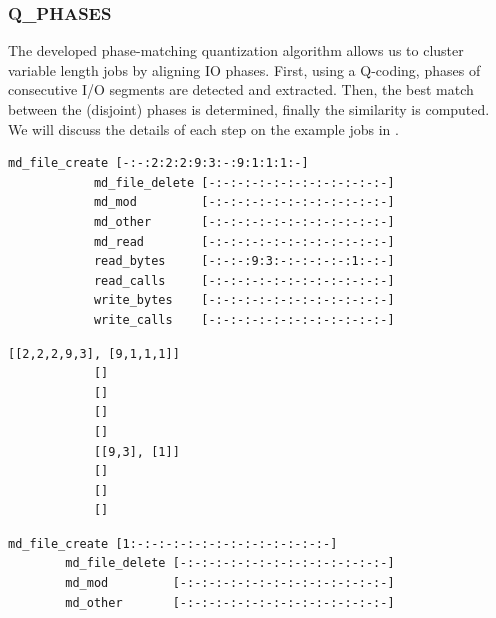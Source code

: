 \documentclass{jhps}
\begin{document}
\FloatBarrier
\subsubsection{Q\_PHASES}
The developed phase-matching quantization algorithm allows us to cluster variable length jobs by aligning IO phases.
First, using a Q-coding, phases of consecutive I/O segments are detected and extracted.
Then, the best match between the (disjoint) phases is determined, finally the similarity is computed.
We will discuss the details of each step on the example jobs in .


\begin{listing}
	\noindent\begin{minipage}{\textwidth}
		\noindent\begin{minipage}{0.6\textwidth}
			\begin{lstlisting}[basicstyle=\fontsize{8}{8}\ttfamily]
			md_file_create [-:-:2:2:2:9:3:-:9:1:1:1:-]
			md_file_delete [-:-:-:-:-:-:-:-:-:-:-:-:-]
			md_mod         [-:-:-:-:-:-:-:-:-:-:-:-:-]
			md_other       [-:-:-:-:-:-:-:-:-:-:-:-:-]
			md_read        [-:-:-:-:-:-:-:-:-:-:-:-:-]
			read_bytes     [-:-:-:9:3:-:-:-:-:-:1:-:-]
			read_calls     [-:-:-:-:-:-:-:-:-:-:-:-:-]
			write_bytes    [-:-:-:-:-:-:-:-:-:-:-:-:-]
			write_calls    [-:-:-:-:-:-:-:-:-:-:-:-:-]
			\end{lstlisting}
			\vspace{-2em}
			\label{lst:sim:pm_quant:job_a}
		\end{minipage}
		\noindent\begin{minipage}{0.39\textwidth}
			\begin{lstlisting}[basicstyle=\fontsize{8}{8}\ttfamily]
			[[2,2,2,9,3], [9,1,1,1]]
			[]
			[]
			[]
			[]
			[[9,3], [1]]
			[]
			[]
			[]
			\end{lstlisting}
			\vspace{-2em}
			\label{lst:sim:pm_quant:phases:job_a}
		\end{minipage}
	\end{minipage}
	\noindent\begin{minipage}{\textwidth}
		\noindent\begin{minipage}{0.60\textwidth}
		\begin{lstlisting}[basicstyle=\fontsize{8}{8}\ttfamily]
		md_file_create [1:-:-:-:-:-:-:-:-:-:-:-:-:-:-]
		md_file_delete [-:-:-:-:-:-:-:-:-:-:-:-:-:-:-]
		md_mod         [-:-:-:-:-:-:-:-:-:-:-:-:-:-:-]
		md_other       [-:-:-:-:-:-:-:-:-:-:-:-:-:-:-]

\end{lstlisting}
\end{minipage}
\end{minipage}
\end{listing}
\end{document}
